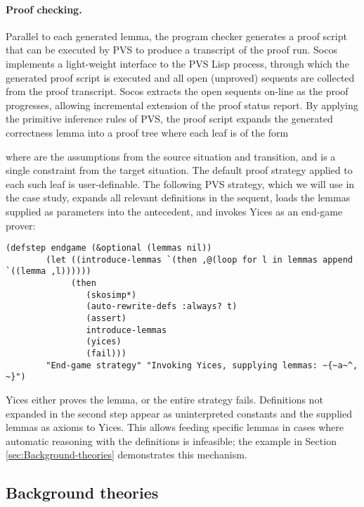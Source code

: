 \documentclass[english,submission]{eptcs}
\begin{document}
\paragraph{Proof checking.}

Parallel to each generated lemma, the program checker generates a
proof script that can be executed by PVS to produce a transcript of
the proof run. Socos implements a light-weight interface to the PVS
Lisp process, through which the generated proof script is executed
and all open (unproved) sequents are collected from the proof transcript.
Socos extracts the open sequents on-line as the proof progresses,
allowing incremental extension of the proof status report. By applying
the primitive inference rules of PVS, the proof script expands the
generated correctness lemma into a proof tree where each leaf is of
the form 

where  are the assumptions from the
source situation and transition, and  is a single constraint
from the target situation. The default proof strategy applied to each
such leaf is user-definable. The following PVS strategy, which we
will use in the case study, expands all relevant definitions in the
sequent, loads the lemmas supplied as parameters into the antecedent,
and invokes Yices as an end-game prover:

\noindent \texttt{}
\begin{lstlisting}[basicstyle={\small\ttfamily},columns=fullflexible,frame=lines,tabsize=3]
(defstep endgame (&optional (lemmas nil))
 		(let ((introduce-lemmas `(then ,@(loop for l in lemmas append `((lemma ,l))))))
 			 (then
 				(skosimp*)
 				(auto-rewrite-defs :always? t) 
 				(assert)
 				introduce-lemmas 
 				(yices) 
 				(fail)))
 		"End-game strategy" "Invoking Yices, supplying lemmas: ~{~a~^, ~}")
\end{lstlisting}


\noindent Yices either proves the lemma, or the entire strategy fails.
Definitions not expanded in the second step appear as uninterpreted
constants and the supplied lemmas as axioms to Yices. This allows
feeding specific lemmas in cases where automatic reasoning with the
definitions is infeasible; the example in Section
\ref{sec:Background-theories} demonstrates this mechanism.


\subsection{Background theories}
\end{document}
